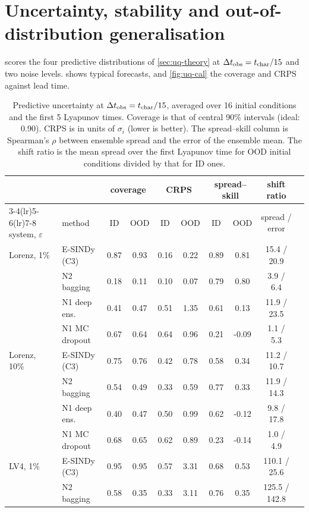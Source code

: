 \section{Uncertainty, stability and out-of-distribution generalisation}\label{sec:exp-uq}

 scores the four predictive distributions of \cref{sec:uq-theory} at $\Delta t_{\mathrm{obs}}=t_{\mathrm{char}}/15$ and two noise levels.  shows typical forecasts, and \cref{fig:uq-cal} the coverage and CRPS against lead time.

\begin{table}[t]
\centering
\caption{Predictive uncertainty at $\Delta t_{\mathrm{obs}}=t_{\mathrm{char}}/15$, averaged over 16 initial conditions and the first 5 Lyapunov times. Coverage is that of central 90\% intervals (ideal: 0.90). CRPS is in units of $\sigma_i$ (lower is better). The spread--skill column is Spearman's $\rho$ between ensemble spread and the error of the ensemble mean. The shift ratio is the mean spread over the first Lyapunov time for OOD initial conditions divided by that for ID ones.}
\label{tab:uq}
\small
\begin{tabular}{llcccccccc}
\toprule
 & & \multicolumn{2}{c}{coverage} & \multicolumn{2}{c}{CRPS} & \multicolumn{2}{c}{spread--skill} & shift ratio \\
\cmidrule(lr){3-4}\cmidrule(lr){5-6}\cmidrule(lr){7-8}
system, $\varepsilon$ & method & ID & OOD & ID & OOD & ID & OOD & spread / error \\
\midrule
Lorenz, 1\% & E-SINDy (C3) & 0.87 & 0.93 & 0.16 & 0.22 & 0.89 & 0.81 & 15.4 / 20.9 \\
 & N2 bagging & 0.18 & 0.11 & 0.10 & 0.07 & 0.79 & 0.80 & 3.9 / 6.4 \\
 & N1 deep ens. & 0.41 & 0.47 & 0.51 & 1.35 & 0.61 & 0.13 & 11.9 / 23.5 \\
 & N1 MC dropout & 0.67 & 0.64 & 0.64 & 0.96 & 0.21 & -0.09 & 1.1 / 5.3 \\
\midrule
Lorenz, 10\% & E-SINDy (C3) & 0.75 & 0.76 & 0.42 & 0.78 & 0.58 & 0.34 & 11.2 / 10.7 \\
 & N2 bagging & 0.54 & 0.49 & 0.33 & 0.59 & 0.77 & 0.33 & 11.9 / 14.3 \\
 & N1 deep ens. & 0.40 & 0.47 & 0.50 & 0.99 & 0.62 & -0.12 & 9.8 / 17.8 \\
 & N1 MC dropout & 0.68 & 0.65 & 0.62 & 0.89 & 0.23 & -0.14 & 1.0 / 4.9 \\
\midrule
LV4, 1\% & E-SINDy (C3) & 0.95 & 0.95 & 0.57 & 3.31 & 0.68 & 0.53 & 110.1 / 25.6 \\
 & N2 bagging & 0.58 & 0.35 & 0.33 & 3.11 & 0.76 & 0.35 & 125.5 / 142.8 \\

\end{tabular}
\end{table}
